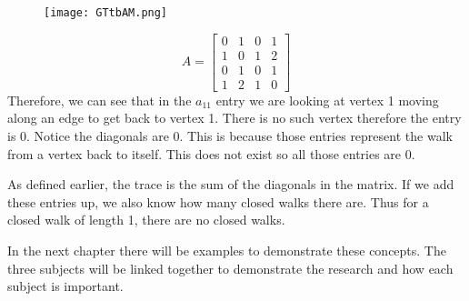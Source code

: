 \begin{figure}[h]
         \centering
         \texttt{[image: GTtbAM.png]}
 \end{figure}
 \[ A =
 \begin{bmatrix}
   0  &  1  &  0  &  1 \\
   1  &  0  &  1  &  2 \\
   0  &  1  &  0  &  1 \\
   1  &  2  &  1  &  0
 \end{bmatrix}\] Therefore, we can see that in the $a_{11}$ entry we are looking at vertex 1 moving along an edge to get back to vertex 1.  There is no such vertex therefore the entry is 0. Notice the diagonals are 0. This is because those entries represent the walk from a vertex back to itself. This does not exist so all those entries are 0. 
 \par As defined earlier, the trace is the sum of the diagonals in the matrix. If we add these entries up, we also know how many closed walks there are. Thus for a closed walk of length 1, there are no closed walks.

In the next chapter there will be examples to demonstrate these concepts. The three subjects will be linked together to demonstrate the research and how each subject is important.
